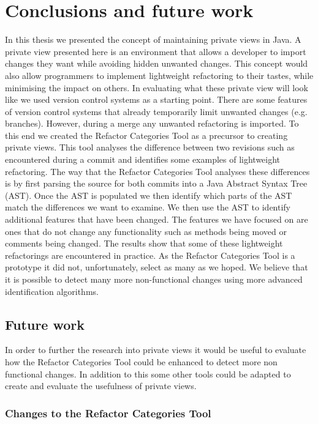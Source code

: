 
\chapter{Conclusions and future work}\label{C:con}

In this thesis we presented the concept of maintaining private views in Java.
A private view presented here is an environment that allows a developer to import changes they want while avoiding hidden unwanted changes. 
This concept would also allow programmers to implement lightweight refactoring to their tastes, while minimising the impact on others.  
In evaluating what these private view will look like we used version control systems as a starting point.
There are some features of version control systems that already temporarily limit unwanted changes (e.g. branches).
However, during a merge any unwanted refactoring is imported. 
To this end we created the Refactor Categories Tool as a precursor to creating private views. 
This tool analyses the difference between two revisions such as encountered during a commit and identifies some examples of lightweight refactoring.
The way that the Refactor Categories Tool analyses these differences is by first parsing the source for both commits into a Java Abstract Syntax Tree (AST).
Once the AST is populated we then identify which parts of the AST match the differences we want to examine.
We then use the AST to identify additional features that have been changed. 
The features we have focused on are ones that do not change any functionality such as methods being moved or comments being changed. 
The results show that some of these lightweight refactorings are encountered in practice.
As the Refactor Categories Tool is a prototype it did not, unfortunately, select as many as we hoped.
We believe that it is possible to detect many more non-functional changes using more advanced identification algorithms.

\section{Future work}

In order to further the research into private views it would be useful to evaluate how the Refactor Categories Tool could be enhanced to detect more non functional changes. 
In addition to this some other tools could be adapted to create and evaluate the usefulness of private views.  
\subsection{Changes to the Refactor Categories Tool}


